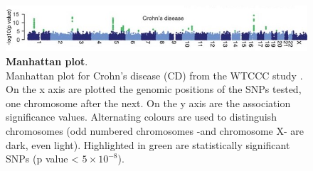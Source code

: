 \begin{figure}[h]
\centering
\includegraphics[width=15cm]{Chapter1/Fig/Manhattan_plots_CD_WTCCC_2007.jpg}
\caption[Manhattan plot]{\textbf{Manhattan plot}.\\
Manhattan plot for Crohn's disease (CD) from the WTCCC study \cite{wellcome2007genome}.
On the x axis are plotted the genomic positions of the SNPs tested, one chromosome after the next.
On the y axis are the association significance values.  
Alternating colours are used to distinguish chromosomes (odd numbered chromosomes -and chromosome X- are dark, even light).
Highlighted in green are statistically significant SNPs (p value < $5 \times 10^{-8}$).}
\label{fig:manhattan}
\end{figure}





